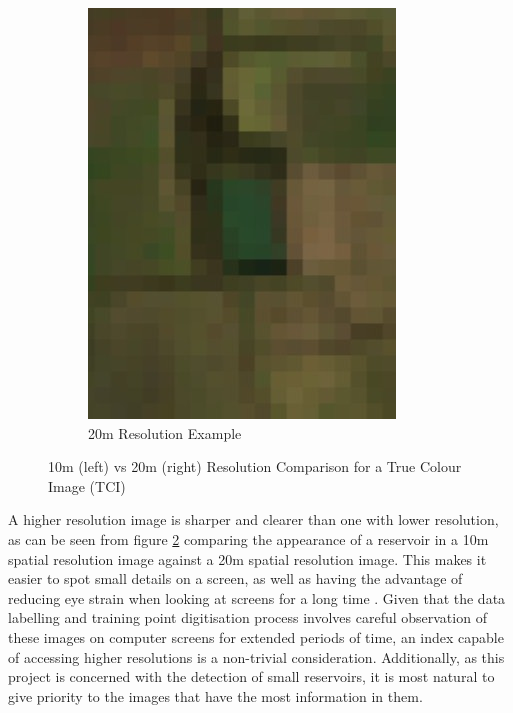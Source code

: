 \begin{figure}[ht]
\begin{subfigure}[b]{0.45\textwidth}
         \includegraphics[width=\textwidth]{contents/figures/LR 20m res.jpg}
         \caption{20m Resolution Example}
         \label{fig:20m resolution example}
     \end{subfigure}
        \caption{10m (left) vs 20m (right) Resolution Comparison for a True Colour Image (TCI)}
        \label{fig:lit review resolution comparison}
\end{figure}

A higher resolution image is sharper and clearer than one with lower resolution, as can be seen from figure \ref{fig:lit review resolution comparison} comparing the appearance of a reservoir in a 10m spatial resolution image against a 20m spatial resolution image. This makes it easier to spot small details on a screen, as well as having the advantage of reducing eye strain when looking at screens for a long time \citep{klein_2024}. Given that the data labelling and training point digitisation process involves careful observation of these images on computer screens for extended periods of time, an index capable of accessing higher resolutions is a non-trivial consideration. Additionally, as this project is concerned with the detection of small reservoirs, it is most natural to give priority to the images that have the most information in them. 

